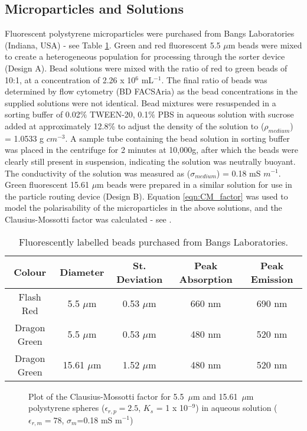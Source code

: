 \subsection{Microparticles and Solutions}
Fluorescent polystyrene microparticles were purchased from Bangs Laboratories (Indiana, USA) - see Table \ref{tab:sorter_fluorescent_beads}. Green and red fluorescent 5.5 $\mu$m beads were mixed to create a heterogeneous population for processing through the sorter device (Design A). Bead solutions were mixed with the ratio of red to green beads of 10:1, at a concentration of 2.26 x 10$^{6}$ mL$^{-1}$. The final ratio of beads was determined by flow cytometry (BD FACSAria) as the bead concentrations in the supplied solutions were not identical. Bead mixtures were resuspended in a sorting buffer of 0.02$\%$ TWEEN-20, 0.1$\%$ PBS in aqueous solution with sucrose added at approximately 12.8\% to adjust the density of the solution to ($\rho_{medium}$) = 1.0533 g $cm^{-3}$. A sample tube containing the bead solution in sorting buffer was placed in the centrifuge for 2 minutes at 10,000g, after which the beads were clearly still present in suspension, indicating the solution was neutrally buoyant. The conductivity of the solution was measured as ($\sigma_{medium}$) = 0.18 mS $m^{-1}$. Green fluorescent 15.61 $\mu$m beads were prepared in a similar solution for use in the particle routing device (Design B). Equation \ref{eqn:CM_factor} was used to model the polarisability of the microparticles in the above solutions, and the Clausius-Mossotti factor was calculated - see .

\begin{table}[b]
	\centering
		\begin{tabular} {c c c c c}
		\hline
		Colour & Diameter & St. Deviation & Peak Absorption & Peak Emission \\
		\hline
		Flash Red &	5.5 $\mu$m & 0.53 $\mu$m & 660 nm & 690 nm \\
		Dragon Green & 5.5 $\mu$m & 0.53 $\mu$m &	480 nm & 520 nm \\
		Dragon Green & 15.61 $\mu$m & 1.52 $\mu$m &	480 nm & 520 nm \\
		\hline			
		\end{tabular}
	\caption{Fluorescently labelled beads purchased from Bangs Laboratories.}
	\label{tab:sorter_fluorescent_beads}
\end{table}



\begin{figure}
\centering
{}
\label{fig:CM_factor_beads_sort_buffer}
\caption[Clausius-Mossotti factor calculated for beads in a low conductivity buffer.]{Plot of the Clausius-Mossotti factor for 5.5~$\mu$m and 15.61~$\mu$m polystyrene spheres ($\epsilon_{r,p} = 2.5$, $K_{s}$ = 1 x 10$^{-9}$) in aqueous solution ($\epsilon_{r,m} = 78$, $\sigma_{m}$=0.18 mS m$^{-1}$)}
\end{figure}


